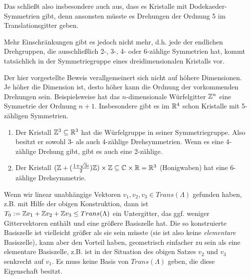 \begin{remark}
Das schließt also insbesondere auch aus, dass es Kristalle mit Dodekaeder-Symmetrien gibt, denn ansonsten müsste es Drehungen der Ordnung 5 im Translationsgitter geben.

Mehr Einschränkungen gibt es jedoch nicht mehr, d.h. jede der endlichen Drehgruppen, die ausschließlich 2-, 3-, 4- oder 6-zählige Symmetrien hat, kommt tatsächlich in der Symmetriegruppe eines dreidimensionalen Kristalls vor.

Der hier vorgestellte Beweis verallgemeinert sich nicht auf höhere Dimensionen. Je höher die Dimension ist, desto höher kann die Ordnung der vorkommenden Drehungen sein. Beispielsweise hat das $n$-dimensionale Würfelgitter $\mathbb{Z}^n$ eine Symmetrie der Ordnung $n+1$. Insbesondere gibt es im $\mathbb{R}^4$ schon Kristalle mit 5-zähligen Symmetrien.
\end{remark}

\begin{example}
\begin{enumerate}
\item Der Kristall $\mathbb{Z}^3\subseteq\mathbb{R}^3$ hat die Würfelgruppe in seiner Symmetriegruppe. Also besitzt er sowohl 3- als auch 4-zählige Drehsymmetrien. Wenn es eine 4-zählige Drehung gibt, gibt es auch eine 2-zählige.
\item Der Kristall $(\mathbb{Z}+(\frac{1+\sqrt{3}i}{2})\mathbb{Z}) \times \mathbb{Z} \subseteq \mathbb{C}\times\mathbb{R} = \mathbb{R}^3$ (Honigwaben) hat eine 6-zählige Drehsymmetrie.
\end{enumerate}
\end{example}

\begin{remark}
Wenn wir linear unabhängige Vektoren $v_1,v_2,v_3\in Trans(\Lambda)$ gefunden haben, z.B. mit Hilfe der obigen Konstruktion, dann ist $T_0:=\mathbb{Z} v_1+\mathbb{Z} v_2+\mathbb{Z} v_3 \leq Trans(\Lambda)$ ein Untergitter, das ggf. weniger Gittervektoren enthält und eine größere Basiszelle hat. Die so konstruierte Basiszelle ist vielleicht größer als sie sein müsste (sie ist also keine \emph{elementare} Basiszelle), kann aber den Vorteil haben, geometrisch einfacher zu sein als eine elementare Basiszelle, z.B. ist in der Situation des obigen Satzes $v_2$ und $v_3$ senkrecht auf $v_1$. Es muss keine Basis von $Trans(\Lambda)$ geben, die diese Eigenschaft besitzt.
\end{remark}

